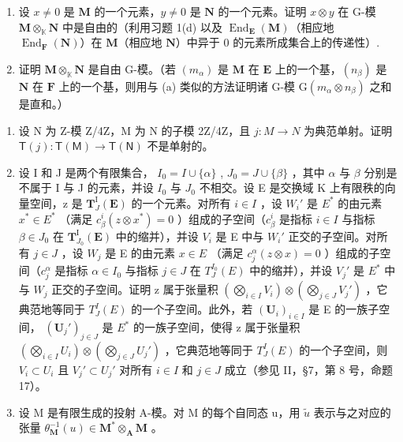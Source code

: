 \begin{enumerate}
\def\labelenumi{(\alph{enumi})}
\item
  设 \(x \neq 0\) 是 \(\mathbf{M}\) 的一个元素，\(y \neq 0\) 是 \(\mathbf{N}\) 的一个元素。证明 \(x \otimes y\) 在 G-模 \(\mathbf{M} \otimes_{\mathbb{K}} \mathbf{N}\) 中是自由的（利用习题 1(d) 以及 \(\operatorname{End}_{\mathbf{E}}(\mathbf{M})\)（相应地 \(\operatorname{End}_{\mathbf{F}}(\mathbf{N})\)）在 \(\mathbf{M}\)（相应地 \(\mathbf{N}\)）中异于 0 的元素所成集合上的传递性）.
\item
  证明 \(\mathbf{M} \otimes_{\mathbb{K}} \mathbf{N}\) 是自由 G-模。（若 \((m_{\alpha})\) 是 \(\mathbf{M}\) 在 \(\mathbf{E}\) 上的一个基，\((n_{\beta})\) 是 \(\mathbf{N}\) 在 \(\mathbf{F}\) 上的一个基，则用与 (a) 类似的方法证明诸 G-模 \(\mathrm{G}(m_{\alpha} \otimes n_{\beta})\) 之和是直和。）
\end{enumerate}

\BourbakiExercisesSection

\begin{enumerate}
\def\labelenumi{\arabic{enumi}.}
\item
  设 N 为 Z-模 Z/4Z，M 为 N 的子模 2Z/4Z，且 \(j:M\to N\) 为典范单射。证明 \(\mathsf{T}(j):\mathsf{T}(\mathsf{M})\to\mathsf{T}(\mathsf{N})\) 不是单射的。
\item
  设 I 和 J 是两个有限集合， \(I_{0} = I \cup \{\alpha\}\) , \(J_{0} = J \cup \{\beta\}\) ，其中 \(\alpha\) 与 \(\beta\) 分别是不属于 I 与 J 的元素，并设 \(I_{0}\) 与 \(J_{0}\) 不相交。设 E 是交换域 K 上有限秩的向量空间，z 是 \(\mathbf{T}_{J}^{\mathrm{I}}(\mathbf{E})\) 的一个元素。对所有 \(i \in I\) ，设 \(W_{i}'\) 是 \(E^{*}\) 的由元素 \(x^{*} \in E^{*}\) （满足 \(c_{\beta}^{i}(z \otimes x^{*}) = 0\) ）组成的子空间（\(c_{\beta}^{i}\) 是指标 \(i \in I\) 与指标 \(\beta \in J_{0}\) 在 \(\mathbf{T}_{J_{0}}^{\mathrm{I}}(\mathbf{E})\) 中的缩并），并设 \(V_{i}\) 是 E 中与 \(W_{i}'\) 正交的子空间。对所有 \(j \in J\) ，设 \(W_{j}\) 是 E 的由元素 \(x \in E\) （满足 \(c_{j}^{\alpha}(z \otimes x) = 0\) ）组成的子空间（\(c_{j}^{\alpha}\) 是指标 \(\alpha \in I_{0}\) 与指标 \(j \in J\) 在 \(T_{J}^{I_{0}}(E)\) 中的缩并），并设 \(V_{j}'\) 是 \(E^{*}\) 中与 \(W_{j}\) 正交的子空间。证明 z 属于张量积 \(\left(\bigotimes_{i \in I} V_{i}\right) \otimes \left(\bigotimes_{j \in J} V_{j}'\right)\) ，它典范地等同于 \(T_{J}^{I}(E)\) 的一个子空间。此外，若 \((\mathbf{U}_{i})_{i \in I}\) 是 E 的一族子空间， \((\mathbf{U}_{j}')_{j \in J}\) 是 \(E^{*}\) 的一族子空间，使得 z 属于张量积 \(\left(\bigotimes_{i \in I} U_{i}\right) \otimes \left(\bigotimes_{j \in J} U_{j}'\right)\) ，它典范地等同于 \(T_{J}^{I}(E)\) 的一个子空间，则 \(V_{i} \subset U_{i}\) 且 \(V_{j}' \subset U_{j}'\) 对所有 \(i \in I\) 和 \(j \in J\) 成立（参见 II，§7，第 8 号，命题 17）。
\item
  设 M 是有限生成的投射 A-模。对 M 的每个自同态 u，用 \(\tilde{u}\) 表示与之对应的张量 \(\theta_{\mathbf{M}}^{-1}(u) \in \mathbf{M}^{*} \otimes_{\mathbf{A}} \mathbf{M}\) 。
\end{enumerate}

